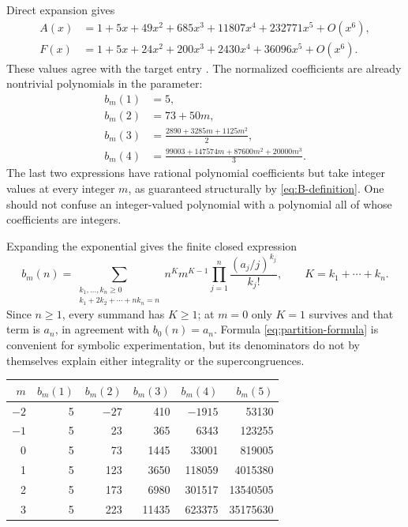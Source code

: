 \documentclass[11pt,letterpaper]{article}
\numberwithin{equation}{section}
\theoremstyle{definition}
\begin{document}
Direct expansion gives
\begin{align*}
A(x)&=1+5x+49x^2+685x^3+11807x^4+232771x^5+O(x^6),\\
F(x)&=1+5x+24x^2+200x^3+2430x^4+36096x^5+O(x^6).
\end{align*}
These values agree with the target entry \cite{oeis-target}.
The normalized coefficients are already nontrivial polynomials in the
parameter:
\begin{equation}\label{eq:small-polynomials}
\begin{split}
b_m(1)&=5,\\
b_m(2)&=73+50m,\\
b_m(3)&=\frac{2890+3285m+1125m^2}{2},\\
b_m(4)&=\frac{99003+147574m+87600m^2+20000m^3}{3}.
\end{split}
\end{equation}
The last two expressions have rational polynomial coefficients but take
integer values at every integer $m$, as guaranteed structurally by
\eqref{eq:B-definition}. One should not confuse an integer-valued
polynomial with a polynomial all of whose coefficients are integers.

Expanding the exponential gives the finite closed expression
\begin{equation}\label{eq:partition-formula}
b_m(n)=\sum_{\substack{k_1,\ldots,k_n\geq0\\
                       k_1+2k_2+\cdots+nk_n=n}}
n^Km^{K-1}\prod_{j=1}^n\frac{(a_j/j)^{k_j}}{k_j!},
\qquad K=k_1+\cdots+k_n.
\end{equation}
Since $n\geq1$, every summand has $K\geq1$; at $m=0$ only $K=1$ survives
and that term is $a_n$, in agreement with $b_0(n)=a_n$. Formula
\eqref{eq:partition-formula} is convenient for symbolic experimentation,
but its denominators do not by themselves explain either integrality or
the supercongruences.

\begin{center}
\small
\begin{tabular}{r r r r r r}
\toprule
$m$ & $b_m(1)$ & $b_m(2)$ & $b_m(3)$ & $b_m(4)$ & $b_m(5)$\\
\midrule
$-2$ & 5 & $-27$ & 410 & $-1915$ & 53130\\
$-1$ & 5 & 23 & 365 & 6343 & 123255\\
0 & 5 & 73 & 1445 & 33001 & 819005\\
1 & 5 & 123 & 3650 & 118059 & 4015380\\
2 & 5 & 173 & 6980 & 301517 & 13540505\\
3 & 5 & 223 & 11435 & 623375 & 35175630\\
\bottomrule
\end{tabular}
\end{center}
\end{document}
